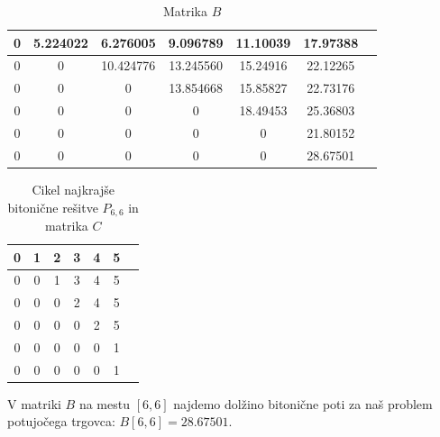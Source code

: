 \documentclass[12pt,a4paper]{amsart}
\theoremstyle{definition}
\theoremstyle{plain}
\begin{document}
\begin{table}[h!]
  \begin{tabular}{|c|c|c|c|c|c|c|}
    \hline
    0 & 5.224022 & 6.276005 & 9.096789 & 11.10039 & 17.97388 \\
    \hline
    0 & 0 & 10.424776 & 13.245560 & 15.24916 & 22.12265 \\
    \hline
    0 & 0 & 0 & 13.854668 & 15.85827 & 22.73176 \\
    \hline
    0 & 0 & 0 & 0 & 18.49453 & 25.36803 \\
    \hline
    0 & 0 & 0 & 0 & 0 & 21.80152 \\
    \hline
    0 & 0 & 0 & 0 & 0 & 28.67501 \\
    \hline
  \end{tabular}
  \caption*{Matrika $B$}
\end{table}

\begin{table}[h]
  \quad%
  \begin{tabular}{|c|c|c|c|c|c|c|}
    \hline
    0 & 1 & 2 & 3 & 4 & 5 \\
    \hline
    0 & 0 & 1 & 3 & 4 & 5 \\
    \hline
    0 & 0 & 0 & 2 & 4 & 5 \\
    \hline
    0 & 0 & 0 & 0 & 2 & 5 \\
    \hline
    0 & 0 & 0 & 0 & 0 & 1 \\
    \hline
    0 & 0 & 0 & 0 & 0 & 1 \\
    \hline
  \end{tabular}
  \caption*{Cikel najkrajše bitonične rešitve $P_{6,6}$ in matrika $C$}
\end{table}

\noindent
V matriki $B$ na mestu $[6,6]$ najdemo dolžino bitonične poti za naš problem potujočega trgovca: 
$B[6,6] = 28.67501.$
\end{document}
